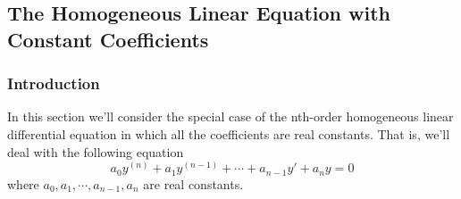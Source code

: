 \vspace{20pt}
\subsection{The Homogeneous Linear Equation with Constant Coefficients}


\subsubsection{Introduction}
In this section we'll consider the special case of the nth-order homogeneous linear differential equation in which all the coefficients are real constants. That is, we'll deal with the following equation
\begin{equation} \label{eq3}
    a_0y^{(n)} + a_1y^{(n-1)} + \cdots + a_{n-1}y' + a_ny = 0
\end{equation}
where $a_0, a_1, \cdots, a_{n-1}, a_n$ are real constants.

